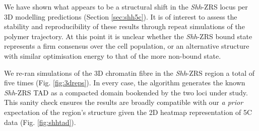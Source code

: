 \documentclass[a4paper,11pt,oneside]{book}
\begin{document}
We have shown what appears to be a structural shift in the \emph{Shh}-ZRS locus per 3D modelling predictions (Section \ref{sec:shh5c}). It is of interest to assess the stability and reproducibility of these results through repeat simulations of the polymer trajectory. At this point it is unclear whether the \emph{Shh}-ZRS bound state represents a firm consensus over the cell population, or an alternative structure with similar optimisation energy to that of the more non-bound state. 


We re-ran simulations of the 3D chromatin fibre in the \emph{Shh}-ZRS region a total of five times (Fig. \ref{fig:3dreps}). In every case, the algorithm generates the known \emph{Shh}-ZRS TAD as a compacted domain bookended by the two loci under study. This sanity check ensures the results are broadly compatible with our \emph{a prior} expectation of the region's structure given the 2D heatmap representation of 5C data (Fig. \ref{fig:shhtad}).
\end{document}
